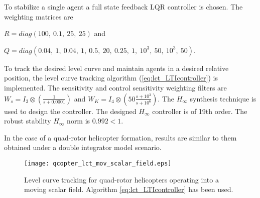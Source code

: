 
To stabilize a single agent a full state feedback LQR controller is chosen. The weighting matrices are

$R=diag(100, \ 0.1, \ 25, \ 25)$ and 

$Q=diag(0.04, \ 1,\ 0.04,\ 1,\ 0.5,\ 20,\ 0.25,\ 1,\ 10^3,\ 50,\ 10^3,\ 50)$.

To track the desired level curve and maintain agents in a desired relative position, the level curve tracking algorithm (\ref{eq:lct_LTIcontroller})  is implemented. The sensitivity and control sensitivity weighting filters are $W_s=I_3 \otimes \left(\frac{1}{s+0.0001} \right)$ and $W_K=I_4 \otimes \left(50 \frac{s+10^3}{s+10^6} \right)$. The $H_{\infty}$ synthesis technique is used to design the controller. The designed $H_{\infty}$ controller is of 19th order. The robust stability $H_{\infty}$ norm is $0.992<1$.

In the case of a quad-rotor helicopter formation, results are similar to them obtained under a double integrator model scenario. 


%

\begin{figure}[!ht]
  \centering
    \texttt{[image: qcopter\_lct\_mov\_scalar\_field.eps]}
  \caption{Level curve tracking for quad-rotor helicopters operating into a moving scalar field. Algorithm  \ref{eq:lct_LTIcontroller} has been used.}
  \label{fig:qcopter_lct_mov_scalar_field}
\end{figure}


